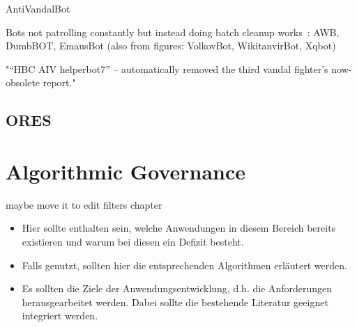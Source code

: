 AntiVandalBot~\cite{HalRied2012}

Bots not patrolling constantly but instead doing batch cleanup works~\cite{GeiHal2013}:
AWB, DumbBOT, EmausBot
(also from figures: VolkovBot, WikitanvirBot, Xqbot)

\cite{GeiRib2010}
"“HBC AIV helperbot7” – automatically
removed the third vandal fighter's now-obsolete report."

\subsection{ORES}


\section{Algorithmic Governance}

maybe move it to edit filters chapter

\begin{itemize}
    \item Hier sollte enthalten sein, welche Anwendungen in diesem Bereich bereits existieren und warum bei diesen ein Defizit besteht.
    \item Falls genutzt, sollten hier die entsprechenden Algorithmen erläutert werden.
    \item Es sollten die Ziele der Anwendungsentwicklung, d.h. die Anforderungen herausgearbeitet werden. Dabei sollte die bestehende Literatur geeignet integriert werden.
\end{itemize}
